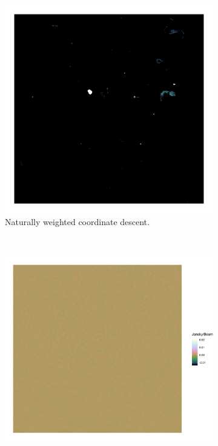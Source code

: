 \begin{figure}[h]
\begin{subfigure}[b]{0.49\linewidth}
		\includegraphics[width=1.00\linewidth, clip, trim={0.72in 0.72in 0.72in 0.72in}]{./chapters/10.results/SerialCD/CD-reference.png}
		\caption{Naturally weighted coordinate descent.}
		\label{results:comp:cd}
	\end{subfigure}
	\\
	\begin{subfigure}[b]{0.49\linewidth}
		\includegraphics[width=1.00\linewidth, clip, trim={0.36in 0.36in 0.0in 0.36in}]{./chapters/10.results/MSClean/briggs-CLEAN-residuals.png}

\end{subfigure}
\end{figure}

